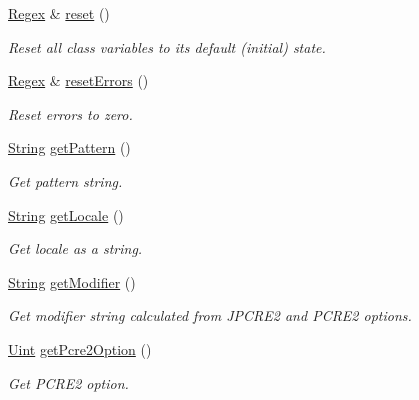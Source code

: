 \begin{DoxyCompactItemize}
\hyperlink{classjpcre2_1_1Regex}{Regex} \& \hyperlink{classjpcre2_1_1Regex_a91f6afe257e9633cbb79a98649ab8d02_a91f6afe257e9633cbb79a98649ab8d02}{reset} ()
\begin{DoxyCompactList}\small\item\em Reset all class variables to its default (initial) state. \end{DoxyCompactList}\item 
\hyperlink{classjpcre2_1_1Regex}{Regex} \& \hyperlink{classjpcre2_1_1Regex_aff12a6e75ecd3e623875d12df49b3b89_aff12a6e75ecd3e623875d12df49b3b89}{reset\+Errors} ()
\begin{DoxyCompactList}\small\item\em Reset errors to zero. \end{DoxyCompactList}\item 
\hyperlink{namespacejpcre2_a91f03070152fb228bc116c5a737f1d16}{String} \hyperlink{classjpcre2_1_1Regex_a006dd17f71a2d717aa9575d72fac6d7b_a006dd17f71a2d717aa9575d72fac6d7b}{get\+Pattern} ()
\begin{DoxyCompactList}\small\item\em Get pattern string. \end{DoxyCompactList}\item 
\hyperlink{namespacejpcre2_a91f03070152fb228bc116c5a737f1d16}{String} \hyperlink{classjpcre2_1_1Regex_ae9afaf627ed922a9e4cee8074d30edfa_ae9afaf627ed922a9e4cee8074d30edfa}{get\+Locale} ()
\begin{DoxyCompactList}\small\item\em Get locale as a string. \end{DoxyCompactList}\item 
\hyperlink{namespacejpcre2_a91f03070152fb228bc116c5a737f1d16}{String} \hyperlink{classjpcre2_1_1Regex_a0ac4e063f00128b96cd94c33609dc559_a0ac4e063f00128b96cd94c33609dc559}{get\+Modifier} ()
\begin{DoxyCompactList}\small\item\em Get modifier string calculated from J\+P\+C\+R\+E2 and P\+C\+R\+E2 options. \end{DoxyCompactList}\item 
\hyperlink{namespacejpcre2_a078242d38221a13fb3543b9edd78c099}{Uint} \hyperlink{classjpcre2_1_1Regex_a857307fc59ba7f010b097e61c1744923_a857307fc59ba7f010b097e61c1744923}{get\+Pcre2\+Option} ()
\begin{DoxyCompactList}\small\item\em Get P\+C\+R\+E2 option. \end{DoxyCompactList}\item 

\end{DoxyCompactItemize}
